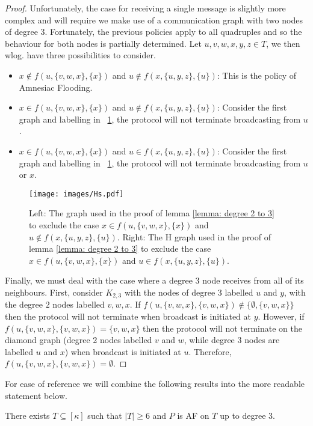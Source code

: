 \begin{proof}
    Unfortunately, the case for receiving a single message is slightly more complex and will require we make use of a communication graph with two nodes of degree $3$.
    Fortunately, the previous policies apply to all quadruples and so the behaviour for both nodes is partially determined.
    Let $u,v,w,x,y,z \in T$, we then wlog. have three possibilities to consider.
    \begin{itemize}
        \item $x \notin f(u,\{v,w,x\},\{x\})$ and $u\notin f(x,\{u,y,z\},\{u\})$: This is the policy of Amnesiac Flooding.
        \item $x \in f(u,\{v,w,x\},\{x\})$ and $u\notin f(x,\{u,y,z\},\{u\})$: Consider the first graph and labelling in ~\cref{fig: diamond and h}, the protocol will not terminate broadcasting from $u$.
        \item $x \in f(u,\{v,w,x\},\{x\})$ and $u\in f(x,\{u,y,z\},\{u\})$: Consider the first graph and labelling in ~\cref{fig: diamond and h}, the protocol will not terminate broadcasting from $u$ or $x$.
    \end{itemize}
    \begin{figure}
        \centering
        \texttt{[image: images/Hs.pdf]}
        \caption{Left: The graph used in the proof of lemma \ref{lemma: degree 2 to 3} to exclude the case $x \in f(u,\{v,w,x\},\{x\})$ and $u\notin f(x,\{u,y,z\},\{u\})$. Right: The H graph used in the proof of lemma \ref{lemma: degree 2 to 3} to exclude the case $x \in f(u,\{v,w,x\},\{x\})$ and $u\in f(x,\{u,y,z\},\{u\})$.}
        \label{fig: diamond and h}
    \end{figure}
    Finally, we must deal with the case where a degree $3$ node receives from all of its neighbours.
    First, consider $K_{2,3}$ with the nodes of degree $3$ labelled $u$ and $y$, with the degree $2$ nodes labelled $v,w,x$.
    If $f(u,\{v,w,x\},\{v,w,x\}) \notin \{\emptyset, \{v,w,x\}\}$ then the protocol will not terminate when broadcast is initiated at $y$.
    However, if $f(u,\{v,w,x\},\{v,w,x\})=\{v,w,x\}$ then the protocol will not terminate on the diamond graph (degree 2 nodes labelled $v$ and $w$, while degree $3$ nodes are labelled $u$ and $x$) when broadcast is initiated at $u$.
    Therefore, $f(u,\{v,w,x\},\{v,w,x\})=\emptyset$.
\end{proof}
For ease of reference we will combine the following results into the more readable statement below.
\begin{lemma}
    There exists $T\subseteq [\kappa]$ such that $|T|\geq 6$ and $P$ is AF on $T$ up to degree 3.
\end{lemma}

